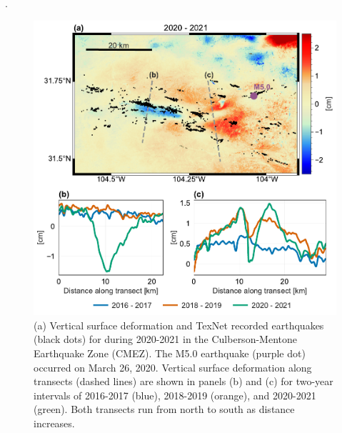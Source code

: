 
.



\begin{figure}
	\centering
	\includegraphics[width=.98\textwidth]{figures/chapter5-lowess/figure-cmez-zoom-transect.pdf}
	\caption[Deformation near Culberson-Mentone Earthquake Zone earthquakes during 2020 - 2021]{
		(a) Vertical surface deformation and TexNet recorded earthquakes (black dots) for during 2020-2021 in the Culberson-Mentone Earthquake Zone (CMEZ).
		The M5.0 earthquake (purple dot) occurred on March 26, 2020.
		Vertical surface deformation along transects (dashed lines) are shown in panels (b) and (c) for two-year intervals of 2016-2017 (blue), 2018-2019 (orange), and 2020-2021 (green). Both transects run from north to south as distance increases.
	}
	\label{fig:ch5-discuss-cmez-transects}
\end{figure}













